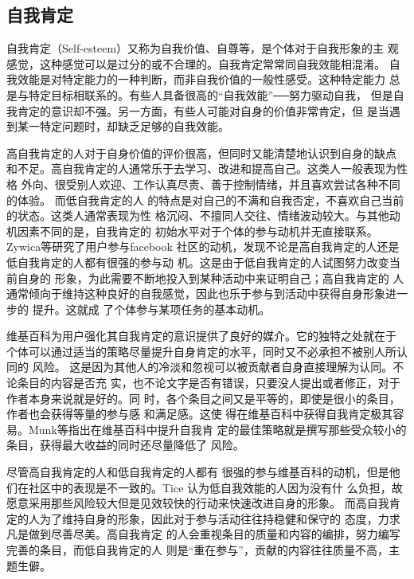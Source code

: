 \subsection{自我肯定}
\label{sec:self-esteem}

自我肯定（Self-esteem）又称为自我价值、自尊等，是个体对于自我形象的主
观感觉，这种感觉可以是过分的或不合理的。自我肯定常常同自我效能相混淆。
自我效能是对特定能力的一种判断，而非自我价值的一般性感受。这种特定能力
总是与特定目标相联系的。有些人具备很高的“自我效能”──努力驱动自我，
但是自我肯定的意识却不强。另一方面，有些人可能对自身的价值非常肯定，但
是当遇到某一特定问题时，却缺乏足够的自我效能。

高自我肯定的人对于自身价值的评价很高，但同时又能清楚地认识到自身的缺点
和不足。高自我肯定的人通常乐于去学习、改进和提高自己。这类人一般表现为性格
外向、很受别人欢迎、工作认真尽责、善于控制情绪，并且喜欢尝试各种不同的体验。
而低自我肯定的人
的特点是对自己的不满和自我否定，不喜欢自己当前的状态。这类人通常表现为性
格沉闷、不擅同人交往、情绪波动较大。与其他动机因素不同的是，自我肯定的
初始水平对于个体的参与动机并无直接联系。Zywica等研究了用户参与facebook
社区的动机，发现不论是高自我肯定的人还是低自我肯定的人都有很强的参与动
机\cite{zywica2008faces}。这是由于低自我肯定的人试图努力改变当前自身的
形象，为此需要不断地投入到某种活动中来证明自己；高自我肯定的
人通常倾向于维持这种良好的自我感觉，因此也乐于参与到活动中获得自身形象进一步的
提升。这就成
了个体参与某项任务的基本动机。

维基百科为用户强化其自我肯定的意识提供了良好的媒介。它的独特之处就在于
个体可以通过适当的策略尽量提升自身肯定的水平，同时又不必承担不被别人所认同的
风险。
这是因为其他人的冷淡和忽视可以被贡献者自身直接理解为认同。不论条目的内容是否充
实，也不论文字是否有错误，只要没人提出或者修正，对于作者本身来说就是好的。同
时，各个条目之间又是平等的，即使是很小的条目，作者也会获得等量的参与感
和满足感。这使
得在维基百科中获得自我肯定极其容易。Munk等指出在维基百科中提升自我肯
定的最佳策略就是撰写那些受众较小的条目，获得最大收益的同时还尽量降低了
风险\cite{munk2009self}。

尽管高自我肯定的人和低自我肯定的人都有
很强的参与维基百科的动机，但是他们在社区中的表现是不一致的。Tice 认为低自我效能的人因为没有什
么负担，故愿意采用那些风险较大但是见效较快的行动来快速改进自身的形象\cite{tice1993social}。
而高自我肯定的人为了维持自身的形象，因此对于参与活动往往持稳健和保守的
态度，力求凡是做到尽善尽美。高自我肯定
的人会重视条目的质量和内容的编排，努力编写完善的条目，而低自我肯定的人
则是“重在参与”，贡献的内容往往质量不高，主题生僻。

